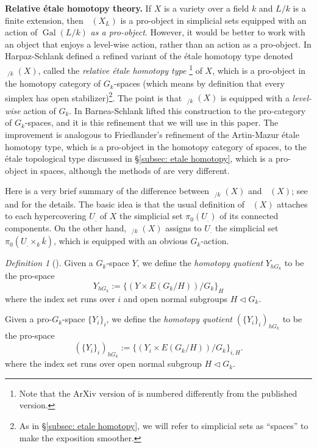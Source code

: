 \documentclass[10pt, reqno]{amsart}
\numberwithin{equation}{subsection}
\newcommand{\Gal}{\operatorname{Gal}}
\newcommand{\ol}[1]{\overline{#1}}
\DeclareMathOperator{\Et}{\acute{E}t}
\theoremstyle{remark}
\newtheorem{defn}[thm]{Definition}
\begin{document}
\noindent \textbf{Relative \'{e}tale homotopy theory.} If $X$ is a variety over a field $k$ and $L/k$ is a finite extension, then $\Et(X_L)$ is a pro-object in simplicial sets equipped with an action of $\Gal(L/k)$ \emph{as a pro-object}. However, it would be better to work with an object that enjoys a level-wise action, rather than an action as a pro-object. In \cite{HS} Harpaz-Schlank defined a refined variant of the \'{e}tale homotopy type denoted $\Et_{/k}(X)$, called the \emph{relative \'{e}tale homotopy type} \cite[\S 9.2.3]{HS}\footnote{Note that the ArXiv version of \cite{HS} is numbered differently from the published version.} of $X$, which is a pro-object in the homotopy category of $G_k$-spaces (which means by definition that every simplex has open stabilizer)\footnote{As in \S \ref{subsec: etale homotopy}, we will refer to simplicial sets as ``spaces'' to make the exposition smoother.}. The point is that $\Et_{/k}(X)$ is equipped with a \emph{level-wise} action of $G_{k}$. In \cite{BS} Barnea-Schlank lifted this construction to the pro-category of $G_k$-spaces, and it is this refinement that we will use in this paper. The improvement is analogous to Friedlander's refinement of the Artin-Mazur \'{e}tale homotopy type, which is a pro-object in the homotopy category of spaces, to the \'{e}tale topological type discussed in \S \ref{subsec: etale homotopy}, which is a pro-object in spaces, although the methods of \cite{BS} are very different. 

Here is a very brief summary of the difference between $\Et_{/k}(X)$ and $\Et(X)$; see \cite[\S 9.2.3]{HS} and \cite[\S 8]{BS} for the details. The basic idea is that the usual definition of $\Et(X)$ attaches to each hypercovering $U_.$ of $X$ the simplicial set $\pi_0(U_.)$ of its connected components. On the other hand, $\Et_{/k}(X)$ assigns to $U_.$ the simplicial set $\pi_0(U_. \times_k\ol{k})$, which is equipped with an obvious $G_k$-action. 


\begin{defn}[{\cite[\S 9.6.2]{HS}}]\label{def: htpy quot}
Given a $G_k$-space $Y$, we define the \emph{homotopy quotient} $Y_{hG_k}$ to be the pro-space 
\[
Y_{hG_k} := \{(Y \times E(G_k/H))/G_k\}_{H}
\]
where the index set runs over $i$ and open normal subgroups $H \triangleleft G_k$. 

Given a pro-$G_k$-space $\{Y_i\}_i$, we define the \emph{homotopy quotient} $(\{Y_i\}_{i})_{hG_k}$ to be the pro-space 
\[
(\{Y_i\}_i)_{hG_k} := \{(Y_i\times E(G_k/H))/G_k\}_{i,H}.
\]
where the index set runs over open normal subgroup $H \triangleleft G_k$. 
\end{defn}
\end{document}

